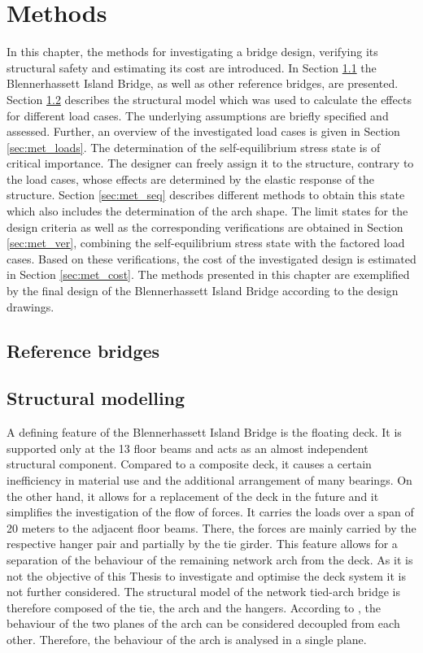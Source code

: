 \section{Methods}\label{sec:methods}
In this chapter, the methods for investigating a bridge design, verifying its structural safety and estimating its cost are introduced. In Section \ref{sec:met_ref} the Blennerhassett Island Bridge, as well as other reference bridges, are presented.
Section \ref{sec:met_str} describes the structural model which was used to calculate the effects for different load cases. The underlying assumptions are briefly specified and assessed. Further, an overview of the investigated load cases is given in Section \ref{sec:met_loads}. The determination of the self-equilibrium stress state is of critical importance. The designer can freely assign it to the structure, contrary to the load cases, whose effects are determined by the elastic response of the structure. Section \ref{sec:met_seq} describes different methods to obtain this state which also includes the determination of the arch shape. The limit states for the design criteria as well as the corresponding verifications are obtained in Section \ref{sec:met_ver}, combining the self-equilibrium stress state with the factored load cases. Based on these verifications, the cost of the investigated design is estimated in Section \ref{sec:met_cost}. The methods presented in this chapter are exemplified by the final design of the Blennerhassett Island Bridge according to the design drawings.

\subsection{Reference bridges} \label{sec:met_ref}

\newpage
\subsection{Structural modelling} \label{sec:met_str}
A defining feature of the Blennerhassett Island Bridge is the floating deck. It is supported only at the 13 floor beams and acts as an almost independent structural component. Compared to a composite deck, it causes a certain inefficiency in material use and the additional arrangement of many bearings. On the other hand, it allows for a replacement of the deck in the future and it simplifies the investigation of the flow of forces. It carries the loads over a span of 20 meters to the adjacent floor beams. There, the forces are mainly carried by the respective hanger pair and partially by the tie girder. This feature allows for a separation of the behaviour of the remaining network arch from the deck. As it is not the objective of this Thesis to investigate and optimise the deck system it is not further considered. The structural model of the network tied-arch bridge is therefore composed of the tie, the arch and the hangers. According to \citep{Smit}, the behaviour of the two planes of the arch can be considered decoupled from each other. Therefore, the behaviour of the arch is analysed in a single plane.\bigskip

